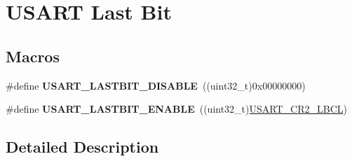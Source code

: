 \hypertarget{group___u_s_a_r_t___last___bit}{}\section{U\+S\+A\+RT Last Bit}
\label{group___u_s_a_r_t___last___bit}
\subsection*{Macros}
\begin{DoxyCompactItemize}
\item 
\#define {\bfseries U\+S\+A\+R\+T\+\_\+\+L\+A\+S\+T\+B\+I\+T\+\_\+\+D\+I\+S\+A\+B\+LE}~((uint32\+\_\+t)0x00000000)\hypertarget{group___u_s_a_r_t___last___bit_gac96499244ffa44ff6fa739da9cc9d53f}{}\label{group___u_s_a_r_t___last___bit_gac96499244ffa44ff6fa739da9cc9d53f}

\item 
\#define {\bfseries U\+S\+A\+R\+T\+\_\+\+L\+A\+S\+T\+B\+I\+T\+\_\+\+E\+N\+A\+B\+LE}~((uint32\+\_\+t)\hyperlink{group___peripheral___registers___bits___definition_ga4a62e93ae7864e89622bdd92508b615e}{U\+S\+A\+R\+T\+\_\+\+C\+R2\+\_\+\+L\+B\+CL})\hypertarget{group___u_s_a_r_t___last___bit_gae851e2151668c666028dc10f20f4f676}{}\label{group___u_s_a_r_t___last___bit_gae851e2151668c666028dc10f20f4f676}

\end{DoxyCompactItemize}


\subsection{Detailed Description}
